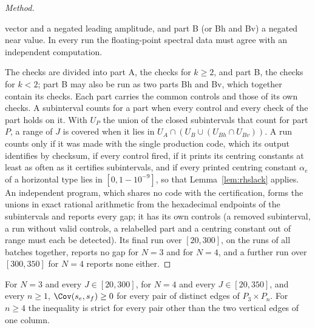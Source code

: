 \begin{proof}[Method]
\begin{enumerate}
vector and a negated leading amplitude, and part B (or Bh and Bv) a negated near value. In every run the floating-point spectral data must agree with
an independent computation.
\end{enumerate}
The checks are divided into part A, the checks for $k\ge2$, and part B, the checks for $k<2$; part B may also be run as two parts Bh and Bv, which
together contain its checks. Each part carries the common controls and those of its own checks. A subinterval counts for a part when every control and
every check of the part holds on it.
With $U_P$ the union of the closed subintervals that count for part $P$, a range of $J$ is covered when it lies in $U_A\cap(U_B\cup(U_{Bh}\cap U_{Bv}))$.
A run counts only if it was made with the single production code, which its output identifies by checksum, if every control fired, if it prints its
centring constants at least as often as it certifies subintervals, and if every printed centring constant $\alpha_e$ of a horizontal type lies in
$[0,1-10^{-9}]$, so that Lemma~\ref{lem:rhslack} applies. An independent program, which
shares no code with the certification, forms the unions in exact rational arithmetic from the hexadecimal endpoints of the subintervals and reports
every gap; it has its own controls (a removed subinterval, a run without valid controls, a relabelled part and a centring constant out of range must
each be detected). Its final run over $[20,300]$, on the runs of all batches together, reports no gap for $N=3$ and for $N=4$, and a further run over $[300,350]$ for $N=4$ reports none either.
\end{proof}

\begin{corollary}\label{cor:rhstrips}
For $N=3$ and every $J\in[20,300]$, for $N=4$ and every $J\in[20,350]$, and every $n\ge1$, $\Cov(s_e,s_f)\ge0$ for every pair of distinct edges
of $P_3\times P_n$. For $n\ge4$ the inequality is strict for every pair other than the two vertical edges of one column.
\end{corollary}

